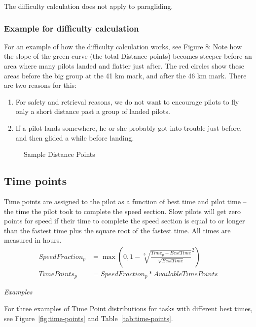 \documentclass{article}
\begin{document}
\begin{pg}
The difficulty calculation does not apply to paragliding.
\end{pg}

\subsubsection{Example for difficulty calculation}
For an example of how the difficulty calculation works, see Figure 8: Note how
the slope of the green curve (the total Distance points) becomes steeper before
an area where many pilots landed and flatter just after. The red circles show
these areas before the big group at the 41 km mark, and after the 46 km mark.
There are two reasons for this:
\begin{enumerate}
    \item For safety and retrieval reasons, we do not want to encourage pilots to fly only a short distance past a group of landed pilots.
    \item If a pilot lands somewhere, he or she probably got into trouble just before, and then glided a while before landing.
\end{enumerate}

\begin{figure}[h]
    \centering
    
    \caption{Sample Distance Points}
\end{figure}

\subsection{Time points}
Time points are assigned to the pilot as a function of best time and pilot time
– the time the pilot took to complete the speed section. Slow pilots will get
zero points for speed if their time to complete the speed section is equal to
or longer than the fastest time plus the square root of the fastest time. All
times are measured in hours.
\begin{align*}
    SpeedFraction_p &= \max(0, 1 - \sqrt[3]{\frac{Time_p - BestTime}{\sqrt{BestTime}}}^2) \\
    TimePoints_p &= SpeedFraction_p * AvailableTimePoints
\end{align*}

\textit{Examples}

For three examples of Time Point distributions for tasks with different best
times, see Figure~\ref{fig:time-points} and Table~\ref{tab:time-points}.
\end{document}
